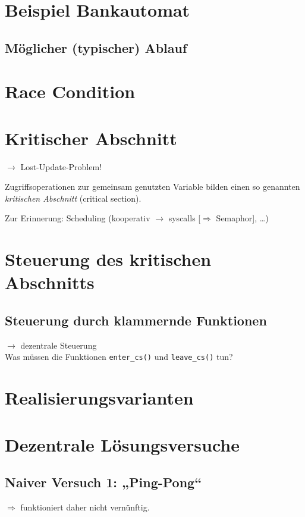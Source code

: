\section{Beispiel Bankautomat}
\subsection*{Möglicher (typischer) Ablauf}
\section{Race Condition}
\section{Kritischer Abschnitt}
$\to$ Lost-Update-Problem!
\begin{framed}
Zugriffsoperationen zur gemeinsam genutzten Variable
bilden einen so genannten \emph{kritischen Abschnitt} (critical
section).
\end{framed}
Zur Erinnerung: Scheduling (kooperativ $\to$ syscalls [$\Rightarrow$ Semaphor], …)
\section{Steuerung des kritischen Abschnitts}
\subsection*{Steuerung durch klammernde Funktionen}
$\to$ dezentrale Steuerung\\
Was müssen die Funktionen \lstinline$enter_cs()$ und \lstinline$leave_cs()$ tun?
\section{Realisierungsvarianten}
\section{Dezentrale Lösungsversuche}
\subsection{Naiver Versuch 1: „Ping-Pong“}
$\Rightarrow$ funktioniert daher nicht vernünftig.
